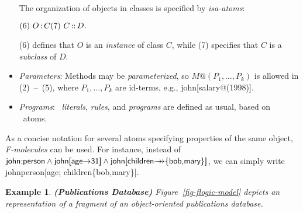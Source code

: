 \documentclass[11pt]{report}
\newtheorem{example}{Example}[section]
\begin{document}
\begin{itemize}
  The organization of objects in classes is specified by
  \emph{isa-atoms}: \medskip

  \begin{math}
    \hfill (6)~O\isa C \hfill (7)~C\subcl D. \hfill
  \end{math} \medskip

  (6) defines that $O$ is an \emph{instance} of class $C$, while (7)
  specifies that $C$ is a \emph{subclass} of $D$. 
\item \emph{Parameters}: Methods may be \emph{parameterized}, so
  \begin{math}
    M@(P_1,\dots,P_k)
  \end{math} is allowed in (2)~--~(5), where $P_1,\dots,P_k$ are
  id-terms, e.g., \textsf{john[salary@(1998)]}.
  
\item \emph{Programs}: \fl\ \emph{literals}, \emph{rules}, and
  \emph{programs} are defined as usual, based on \fl\ atoms.
\end{itemize}

\NI As a concise notation for several atoms specifying properties of the
same object, \emph{F-molecules} can be used. For instance, instead of
$\textsf{john:person}\land\textsf{john[age\ensuremath{{\rightarrow}}31]}\land\textsf{john[children\ensuremath{{\rightarrow\!\!\!\!\rightarrow}}\{bob,mary\}]}$, we can simply write
\textsf{john\isa person[age; children\mvd\{bob,mary\}]}.


\begin{example}
  {\bf (Publications Database)}
  Figure~\ref{fig-flogic-model} depicts an \fl representation of a fragment
  of an object-oriented publications database.
\end{example}
\end{document}
